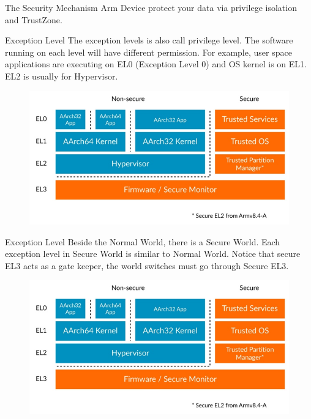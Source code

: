 \documentclass{beamer}
\begin{document}
\begin{frame}{The Security Mechanism}
    Arm Device protect your data via privilege isolation and TrustZone.
\end{frame}

\begin{frame}{Exception Level}
    The exception levels is also call privilege level. The software running on each level will have different permission. For example, user space applications are executing on EL0 (Exception Level 0) and OS kernel is on EL1. EL2 is usually for Hypervisor.
    \begin{figure}
        \centering
        \includegraphics[scale=.30]{SUSTech-Beamer-Theme/pic/image.png}
        \label{fig:my_label}
    \end{figure}
\end{frame}

\begin{frame}{Exception Level}
    Beside the Normal World, there is a Secure World. Each exception level in Secure World is similar to Normal World. Notice that secure EL3 acts as a gate keeper, the world switches must go through Secure EL3.
    \begin{figure}
        \centering
        \includegraphics[scale=.30]{SUSTech-Beamer-Theme/pic/image.png}
        \label{fig:my_label}
    \end{figure}
\end{frame}
\end{document}

